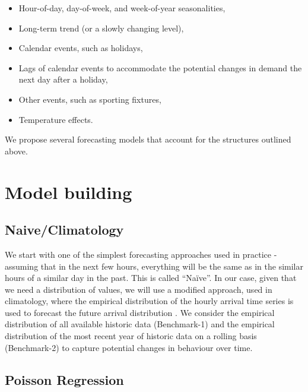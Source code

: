 \documentclass[]{elsarticle} %
\providecommand{\tightlist}{%
  \setlength{\itemsep}{0pt}\setlength{\parskip}{0pt}}
\begin{document}
\begin{itemize}
\tightlist
\item
  Hour-of-day, day-of-week, and week-of-year seasonalities,
\item
  Long-term trend (or a slowly changing level),
\item
  Calendar events, such as holidays,
\item
  Lags of calendar events to accommodate the potential changes in demand the next day after a holiday,
\item
  Other events, such as sporting fixtures,
\item
  Temperature effects.
\end{itemize}

We propose several forecasting models that account for the structures outlined above.

\hypertarget{model}{%
\section{Model building}\label{model}}

\hypertarget{climatology}{%
\subsection{Naive/Climatology}\label{climatology}}

We start with one of the simplest forecasting approaches used in practice - assuming that in the next few hours, everything will be the same as in the similar hours of a similar day in the past. This is called ``Naïve''. In our case, given that we need a distribution of values, we will use a modified approach, used in climatology, where the empirical distribution of the hourly arrival time series is used to forecast the future arrival distribution \citep{la2021new}. We consider the empirical distribution of all available historic data (Benchmark-1) and the empirical distribution of the most recent year of historic data on a rolling basis (Benchmark-2) to capture potential changes in behaviour over time.

\hypertarget{poisson-regression}{%
\subsection{Poisson Regression}\label{poisson-regression}}
\end{document}
